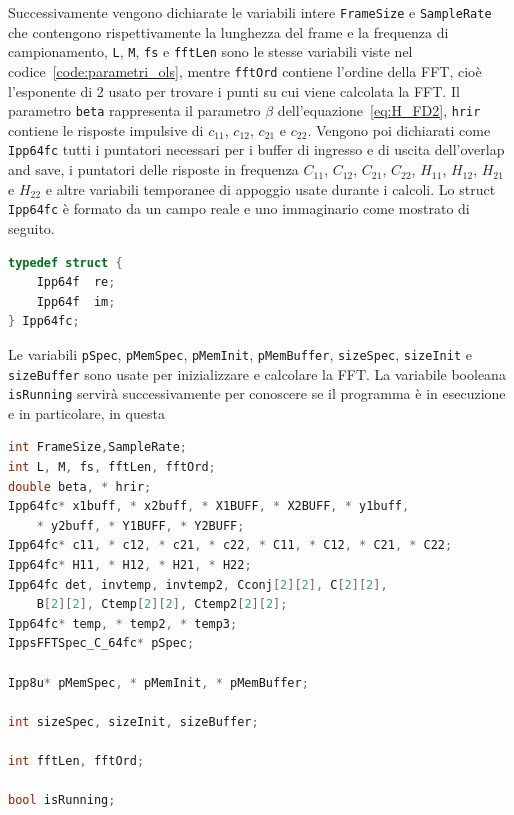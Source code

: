 \documentclass[12pt,a4paper,titlepage]{article}
\begin{document}
Successivamente vengono dichiarate le variabili intere \texttt{FrameSize} e \texttt{SampleRate} che contengono rispettivamente la lunghezza del frame e la frequenza di campionamento, \texttt{L}, \texttt{M}, \texttt{fs} e \texttt{fftLen} sono le stesse variabili viste nel codice~\ref{code:parametri_ols}, mentre \texttt{fftOrd} contiene l'ordine della FFT, cioè l'esponente di 2 usato per trovare i punti su cui viene calcolata la FFT. Il parametro \texttt{beta} rappresenta il parametro $\beta$ dell'equazione~\eqref{eq:H_FD2}, \texttt{hrir} contiene le risposte impulsive di $c_{11}$, $c_{12}$, $c_{21}$ e $c_{22}$. Vengono poi dichiarati come \texttt{Ipp64fc} tutti i puntatori necessari per i buffer di ingresso e di uscita dell'overlap and save, i puntatori delle risposte in frequenza  $C_{11}$, $C_{12}$, $C_{21}$, $C_{22}$, $H_{11}$, $H_{12}$, $H_{21}$ e $H_{22}$ e altre variabili temporanee di appoggio usate durante i calcoli. Lo struct \texttt{Ipp64fc} è formato da un campo reale e uno immaginario come mostrato di seguito.

\begin{lstlisting}[language=cpp, label=code:Ipp64fc, caption = Struct \texttt{Ipp64fc}, captionpos = b]
typedef struct {
    Ipp64f  re;
    Ipp64f  im;
} Ipp64fc;
\end{lstlisting}

Le variabili \texttt{pSpec}, \texttt{pMemSpec}, \texttt{pMemInit}, \texttt{pMemBuffer}, \texttt{sizeSpec}, \texttt{sizeInit} e \texttt{sizeBuffer} sono usate per inizializzare e calcolare la FFT. La variabile booleana \texttt{isRunning} servirà successivamente per conoscere se il programma è in esecuzione e in particolare, in questa 

\begin{lstlisting}[language=cpp, label=code:variabili, caption = Dichiarazione delle variabili in \texttt{Plugin.h}, breaklines = false, captionpos = b]
int FrameSize,SampleRate;
int L, M, fs, fftLen, fftOrd;
double beta, * hrir;
Ipp64fc* x1buff, * x2buff, * X1BUFF, * X2BUFF, * y1buff, 
	* y2buff, * Y1BUFF, * Y2BUFF;
Ipp64fc* c11, * c12, * c21, * c22, * C11, * C12, * C21, * C22;
Ipp64fc* H11, * H12, * H21, * H22;
Ipp64fc det, invtemp, invtemp2, Cconj[2][2], C[2][2], 
	B[2][2], Ctemp[2][2], Ctemp2[2][2];
Ipp64fc* temp, * temp2, * temp3;
IppsFFTSpec_C_64fc* pSpec;

Ipp8u* pMemSpec, * pMemInit, * pMemBuffer;

int sizeSpec, sizeInit, sizeBuffer;

int fftLen, fftOrd;

bool isRunning;
\end{lstlisting}
\end{document}
